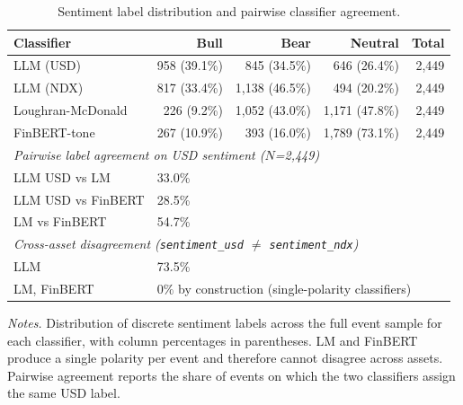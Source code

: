 \begin{table}[!htbp]
\centering
\caption{Sentiment label distribution and pairwise classifier agreement.}
\label{tab:sentiment-dist}
\begin{threeparttable}
\small
\begin{tabular}{lrrrr}
\toprule
\textbf{Classifier} & \textbf{Bull} & \textbf{Bear} & \textbf{Neutral} & \textbf{Total} \\
\midrule
LLM (USD) & 958 (39.1\%) & 845 (34.5\%) & 646 (26.4\%) & 2,449 \\
LLM (NDX) & 817 (33.4\%) & 1,138 (46.5\%) & 494 (20.2\%) & 2,449 \\
Loughran-McDonald & 226 (9.2\%) & 1,052 (43.0\%) & 1,171 (47.8\%) & 2,449 \\
FinBERT-tone & 267 (10.9\%) & 393 (16.0\%) & 1,789 (73.1\%) & 2,449 \\
\midrule
\multicolumn{5}{l}{\textit{Pairwise label agreement on USD sentiment ($N$=2,449)}} \\
\quad LLM USD vs LM & \multicolumn{4}{l}{33.0\%} \\
\quad LLM USD vs FinBERT & \multicolumn{4}{l}{28.5\%} \\
\quad LM vs FinBERT & \multicolumn{4}{l}{54.7\%} \\
\midrule
\multicolumn{5}{l}{\textit{Cross-asset disagreement (\texttt{sentiment\_usd} $\neq$ \texttt{sentiment\_ndx})}} \\
\quad LLM & \multicolumn{4}{l}{73.5\%} \\
\quad LM, FinBERT & \multicolumn{4}{l}{$0\%$ by construction (single-polarity classifiers)} \\
\bottomrule
\end{tabular}
\begin{tablenotes}
\footnotesize
\item \textit{Notes.} Distribution of discrete sentiment labels
across the full event sample for each classifier, with column
percentages in parentheses. LM and FinBERT produce a single
polarity per event and therefore cannot disagree across
assets. Pairwise agreement reports the share of events on
which the two classifiers assign the same USD label.
\end{tablenotes}
\end{threeparttable}
\end{table}
